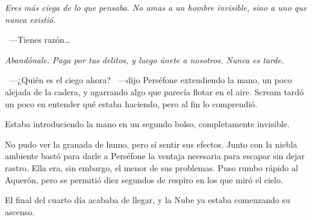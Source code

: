\emph{Eres más ciega de lo que pensaba. No amas a un hombre invisible, sino a uno que nunca existió.}

~---Tienes razón\dots

\emph{Abandónale. Paga por tus delitos, y luego únete a nosotros. Nunca es tarde.}

~---¿Quién es el ciego ahora? ~---dijo Perséfone extendiendo la mano, un poco alejada de la cadera, y agarrando algo que parecía flotar en el aire. Scream tardó un poco en entender qué estaba haciendo, pero al fin lo comprendió.

Estaba introduciendo la mano en un segundo bolso, completamente invisible.

No pudo ver la granada de humo, pero sí sentir sus efectos. Junto con la niebla ambiente bastó para darle a Perséfone la ventaja necesaria para escapar sin dejar rastro. Ella era, sin embargo, el menor de sus problemas. Puso rumbo rápido al Aquerón, pero se permitió diez segundos de respiro en los que miró el cielo.

El final del cuarto día acababa de llegar, y la Nube ya estaba comenzando su ascenso.

\endinput
